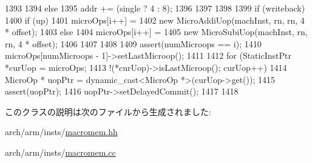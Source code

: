 \begin{DoxyCode}
{{{{1393             }
1394         } else {
1395             addr += (single ? 4 : 8);
1396         }
1397     }
1398 
1399     if (writeback) {
1400         if (up) {
1401             microOps[i++] =
1402                 new MicroAddiUop(machInst, rn, rn, 4 * offset);
1403         } else {
1404             microOps[i++] =
1405                 new MicroSubiUop(machInst, rn, rn, 4 * offset);
1406         }
1407     }
1408 
1409     assert(numMicroops == i);
1410     microOps[numMicroops - 1]->setLastMicroop();
1411 
1412     for (StaticInstPtr *curUop = microOps;
1413             !(*curUop)->isLastMicroop(); curUop++) {
1414         MicroOp * uopPtr = dynamic_cast<MicroOp *>(curUop->get());
1415         assert(uopPtr);
1416         uopPtr->setDelayedCommit();
1417     }
1418 }

\end{DoxyCode}


このクラスの説明は次のファイルから生成されました:\begin{DoxyCompactItemize}
\item 
arch/arm/insts/\hyperlink{macromem_8hh}{macromem.hh}\item 
arch/arm/insts/\hyperlink{macromem_8cc}{macromem.cc}\end{DoxyCompactItemize}
